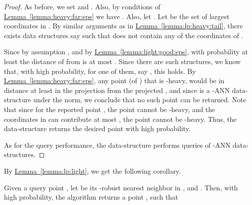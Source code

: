 \documentclass[12pt]{article}\usepackage[cm]{fullpage}
\newcommand{\Term}[1]{\textsf{#1}}
\theoremstyle{remark}\theoremheaderfont{\sf}\theorembodyfont{\upshape}\newtheorem{defn}[theorem]{Definition}
\numberwithin{figure}{section}\numberwithin{table}{section}\numberwithin{equation}{section}
\newcommand{\HLink}[2]{\hyperref[#2]{#1~\ref*{#2}}}
\newcommand{\lemref}[1]{\HLink{Lemma}{lemma:#1}}
\newcommand{\ANN}{\Term{ANN}\xspace}\newcommand{\NN}{\Term{NN}\xspace}
\begin{document}
\begin{proof}
    As before, we set  and
    . Also, by conditions of
    \lemref{heavy:far:eps} we have
    .
    Also, let .  Let 
    be the set of  largest coordinates in
    . By similar arguments as in
    \lemref{lp:heavy:tail}, there exists
     data structures say
     such that 
    does not contain any of the coordinates of .

    Since by assumption
    ,
    and by \lemref{light:good:eps}, with probability at least
     the distance of  from  is
    at most . Since there are
     such structures, we know that, with
    high probability, for one of them, say , this holds.  By
    \lemref{heavy:far:eps}, any point  (of )
    that is -heavy, would be in distance at
    least  in the projection 
    from the projected , and since  is a
    -\ANN data-structure under the  norm, we
    conclude that no such point can be returned.  Note that since for
    the reported point , the point  cannot be
    -heavy, and the coordinates in  can
    contribute at most ,
    the point  cannot be -heavy. Thus,
    the data-structure returns the desired point with high
    probability.

    As for the query performance, the data-structure performs
     queries of -\ANN data-structures.
\end{proof}

By \lemref{lp:light}, we get the following corollary.
\begin{corollary}
    Given a query point , let 
    be its -robust nearest neighbor in , and
    . Then, with high
    probability, the algorithm returns a point ,
    such that
    
\end{corollary}
\end{document}
